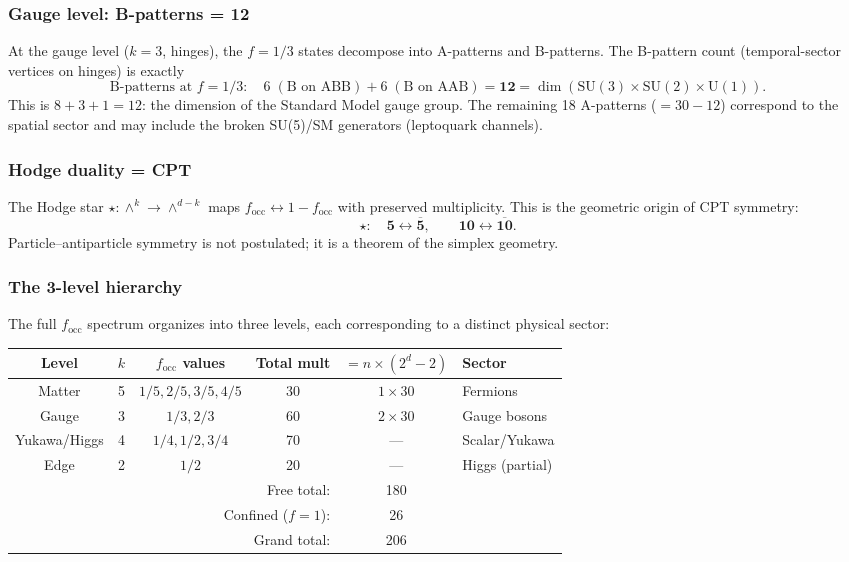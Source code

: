 \documentclass[12pt]{article}
\theoremstyle{remark}
\theoremstyle{definition}
\begin{document}
\subsubsection{Gauge level: B-patterns = 12}

At the gauge level ($k = 3$, hinges), the $f = 1/3$ states decompose into A-patterns and B-patterns.  The B-pattern count (temporal-sector vertices on hinges) is exactly
\begin{equation}
\text{B-patterns at } f = 1/3: \quad 6\;(\text{B on ABB}) + 6\;(\text{B on AAB}) = \mathbf{12} = \dim(\text{SU}(3) \times \text{SU}(2) \times \text{U}(1)).
\end{equation}
This is $8 + 3 + 1 = 12$: the dimension of the Standard Model gauge group.  The remaining 18 A-patterns ($= 30 - 12$) correspond to the spatial sector and may include the broken SU(5)/SM generators (leptoquark channels).

\subsubsection{Hodge duality = CPT}

The Hodge star $\star: \wedge^k \to \wedge^{d-k}$ maps $f_\mathrm{occ} \leftrightarrow 1 - f_\mathrm{occ}$ with preserved multiplicity.  This is the geometric origin of CPT symmetry:
\begin{equation}
\star: \quad \mathbf{5} \leftrightarrow \overline{\mathbf{5}}, \qquad \mathbf{10} \leftrightarrow \overline{\mathbf{10}}.
\end{equation}
Particle--antiparticle symmetry is not postulated; it is a theorem of the simplex geometry.

\subsubsection{The 3-level hierarchy}

The full $f_\mathrm{occ}$ spectrum organizes into three levels, each corresponding to a distinct physical sector:
\begin{center}
\begin{tabular}{cccccl}
\hline
Level & $k$ & $f_\mathrm{occ}$ values & Total mult & $= n \times (2^d - 2)$ & Sector \\
\hline
Matter & 5 & $1/5, 2/5, 3/5, 4/5$ & 30 & $1 \times 30$ & Fermions \\
Gauge  & 3 & $1/3, 2/3$           & 60 & $2 \times 30$ & Gauge bosons \\
Yukawa/Higgs & 4 & $1/4, 1/2, 3/4$ & 70 & --- & Scalar/Yukawa \\
Edge   & 2 & $1/2$                & 20 & --- & Higgs (partial) \\
\hline
\multicolumn{4}{r}{Free total:} & 180 & \\
\multicolumn{4}{r}{Confined ($f=1$):} & 26 & \\
\multicolumn{4}{r}{Grand total:} & 206 & \\
\hline
\end{tabular}
\end{center}
\end{document}
